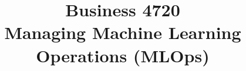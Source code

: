 \documentclass{article}
\title{Business 4720\\ \vspace{\baselineskip}
Managing Machine Learning Operations (MLOps)}
\begin{document}
\maketitle

\vfill

\clearpage


\end{document}
